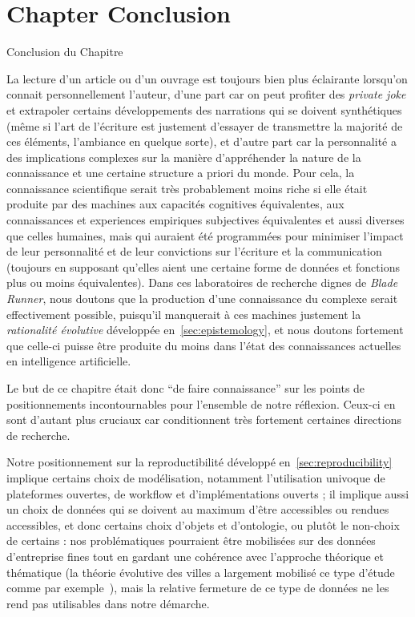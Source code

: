 


\newpage


\section*{Chapter Conclusion}{Conclusion du Chapitre}


La lecture d'un article ou d'un ouvrage est toujours bien plus éclairante lorsqu'on connait personnellement l'auteur, d'une part car on peut profiter des \emph{private joke} et extrapoler certains développements des narrations qui se doivent synthétiques (même si l'art de l'écriture est justement d'essayer de transmettre la majorité de ces éléments, l'ambiance en quelque sorte), et d'autre part car la personnalité a des implications complexes sur la manière d'appréhender la nature de la connaissance et une certaine structure a priori du monde. Pour cela, la connaissance scientifique serait très probablement moins riche si elle était produite par des machines aux capacités cognitives équivalentes, aux connaissances et experiences empiriques subjectives équivalentes et aussi diverses que celles humaines, mais qui auraient été programmées pour minimiser l'impact de leur personnalité et de leur convictions sur l'écriture et la communication (toujours en supposant qu'elles aient une certaine forme de données et fonctions plus ou moins équivalentes). Dans ces laboratoires de recherche dignes de \emph{Blade Runner}, nous doutons que la production d'une connaissance du complexe serait effectivement possible, puisqu'il manquerait à ces machines justement la \emph{rationalité évolutive} développée en~\ref{sec:epistemology}, et nous doutons fortement que celle-ci puisse être produite du moins dans l'état des connaissances actuelles en intelligence artificielle.

Le but de ce chapitre était donc ``de faire connaissance'' sur les points de positionnements incontournables pour l'ensemble de notre réflexion. Ceux-ci en sont d'autant plus cruciaux car conditionnent très fortement certaines directions de recherche.

Notre positionnement sur la reproductibilité développé en~\ref{sec:reproducibility} implique certains choix de modélisation, notamment l'utilisation univoque de plateformes ouvertes, de workflow et d'implémentations ouverts ; il implique aussi un choix de données qui se doivent au maximum d'être accessibles ou rendues accessibles, et donc certains choix d'objets et d'ontologie, ou plutôt le non-choix de certains : nos problématiques pourraient être mobilisées sur des données d'entreprise fines tout en gardant une cohérence avec l'approche théorique et thématique (la théorie évolutive des villes a largement mobilisé ce type d'étude comme par exemple~\cite{paulus2004coevolution}), mais la relative fermeture de ce type de données ne les rend pas utilisables dans notre démarche.

